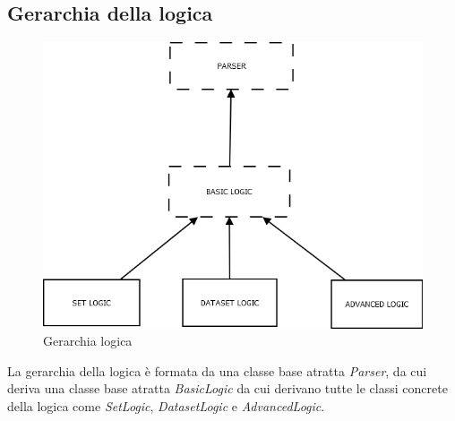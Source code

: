 \documentclass[a4paper,10pt]{article}
\begin{document}
    \subsection{Gerarchia della logica}
    \begin{figure}[!h]
		\begin{center} \includegraphics[scale=0.5]{img/Diagramma1.png}
			\caption{Gerarchia logica}
		\end{center}
	\end{figure}
    La gerarchia della logica è formata da una classe base atratta \textit{Parser}, da cui deriva una classe base atratta \textit{BasicLogic} da cui derivano tutte le classi concrete della logica come \textit{SetLogic}, \textit{DatasetLogic} e \textit{AdvancedLogic}.
        
\end{document}

